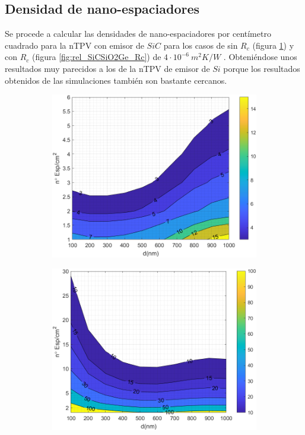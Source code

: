 \subsection{Densidad de nano-espaciadores}
Se procede a calcular las densidades de nano-espaciadores por centímetro cuadrado para la nTPV con emisor de $SiC$ para los casos de sin $R_c$ (figura \ref{fig:rel_SiCSiO2Ge}) y con $R_c$ (figura \ref{fig:rel_SiCSiO2Ge_Rc}) de $4\cdot 10^{-6} \ m^2 K/W$ \cite{nf_TPV_Pillars_SiO2}. Obteniéndose unos resultados muy parecidos a los de la nTPV de emisor de $Si$ porque los resultados obtenidos de las simulaciones también son bastante cercanos.
\graphicspath{ {./figuras/Resultados/RelacionCondRad} }
\begin{figure}[H]
	\centering
	\begin{subfigure}[b]{0.49\textwidth}
		\centering
		\includegraphics[width=1.00\textwidth]{SiC_Ge.png}
		\caption{ }
		\label{fig:rel_SiCSiO2Ge}
	\end{subfigure}
	\hfill
	\begin{subfigure}[b]{0.49\textwidth}
		\centering
		\includegraphics[width=1.00\textwidth]{SiC_Rc.png}

\end{subfigure}
\end{figure}
